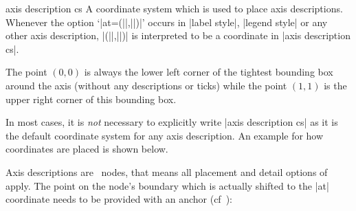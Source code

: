 \begin{coordinatesystem}{axis description cs}
\label{pgfplots:sec:axis:description:cs}
	A coordinate system which is used to place axis descriptions. Whenever the option `|at={(||,||)}|' occurs in |label style|, |legend style| or any other axis description, |(||,||)| is interpreted to be a coordinate in |axis description cs|.

	The point $(0,0)$ is always the lower left corner of the tightest bounding box around the axis (without any descriptions or ticks) while the point $(1,1)$ is the upper right corner of this bounding box.

	In most cases, it is \emph{not} necessary to explicitly write |axis description cs| as it is the default coordinate system for any axis description. An example for how coordinates are placed is shown below.
	
\begin{codeexample}[width=4cm]
\end{codeexample}

Axis descriptions are \Tikz\ nodes, that means all placement and detail options of \cite{tikz} apply. The point on the node's boundary which is actually shifted to the |at| coordinate needs to be provided with an anchor (cf~\cite[Nodes and Edges]{tikz}):
\begin{codeexample}[]
\end{codeexample}
	

\end{coordinatesystem}
